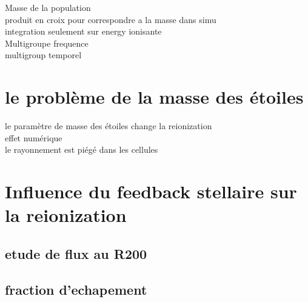 Masse de la population\\
produit en croix pour correspondre a la masse dans simu\\
integration seulement sur energy ionisante\\

Multigroupe frequence\\
multigroup temporel\\


\section{le problème de la masse des étoiles}

le paramètre de masse des étoiles change la reionization\\
effet numérique\\
le rayonnement est piégé dans les cellules\\






\section{Influence du feedback stellaire sur la reionization}

\subsection{etude de flux au R200}

\subsection{fraction d'echapement}

